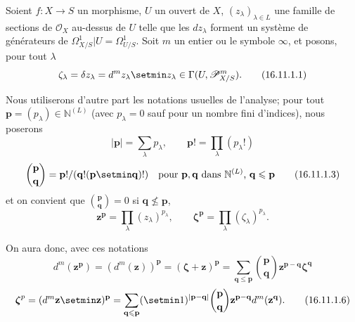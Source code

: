 \begin{env}[16.11.1]
\label{IV.16.11.1}
Soient $f:X\to S$ un morphisme, $U$ un ouvert de $X$,
$(z_\lambda)_{\lambda\in L}$ une famille de sections de $\mathcal{O}_X$
au-dessus de $U$ telle que les $dz_\lambda$ forment un système de générateurs
de $\varOmega_{X/S}^1|U=\varOmega_{U/S}^1$. Soit $m$ un entier ou le symbole
$\infty$, et posons, pour tout $\lambda$
\[
  \zeta_\lambda=\delta z_\lambda=d^m z_\lambda\setmin z_\lambda
  \in\Gamma(U,\mathscr{P}_{X/S}^m).
  \tag{16.11.1.1}
  \label{IV.16.11.1.1}
\]

Nous utiliserons d'autre part les notations usuelles de l'analyse; pour tout
$\mathbf{p}=(p_\lambda)\in\mathbb{N}^{(L)}$ (avec $p_\lambda=0$ sauf pour un
nombre fini d'indices), nous poserons
\[
  |\mathbf{p}|=\sum_\lambda p_\lambda,
  \qquad \mathbf{p}!=\prod_\lambda(p_\lambda!)
  \tag{16.11.1.2}
  \label{IV.16.11.1.2}
\]
\[
  \binom{\mathbf{p}}{\mathbf{q}}
  =\mathbf{p}!/(\mathbf{q}!(\mathbf{p}\setmin\mathbf{q})!)
  \quad\text{pour $\mathbf{p},\mathbf{q}$ dans $\mathbb{N}^{(L)}$,
  $\mathbf{q}\leq\mathbf{p}$}
  \tag{16.11.1.3}
  \label{IV.16.11.1.3}
\]
et on convient que $\binom{\mathbf{p}}{\mathbf{q}}=0$ si
$\mathbf{q}\nleq\mathbf{p}$,
\[
  \mathbf{z}^{\mathbf{p}}=\prod_\lambda(z_\lambda)^{p_\lambda},
  \qquad
  \boldsymbol{\zeta}^{\mathbf{p}}=\prod_\lambda(\zeta_\lambda)^{p_\lambda}.
  \tag{16.11.1.4}
  \label{IV.16.11.1.4}
\]

On aura donc, avec ces notations
\[
  d^m(\mathbf{z}^{\mathbf{p}})
  =(d^m(\mathbf{z}))^{\mathbf{p}}
  =(\boldsymbol{\zeta}+\mathbf{z})^{\mathbf{p}}
  =\sum_{\mathbf{q}\leq\mathbf{p}}
    \binom{\mathbf{p}}{\mathbf{q}}
    \mathbf{z}^{\mathbf{p}-\mathbf{q}}\boldsymbol{\zeta}^{\mathbf{q}}
  \tag{16.11.1.5}
  \label{IV.16.11.1.5}
\]
\[
  \boldsymbol{\zeta}^{p}
  =(d^m\mathbf{z}\setmin\mathbf{z})^{\mathbf{p}}
  =\sum_{\mathbf{q}\leq\mathbf{p}}
    (\setmin 1)^{|\mathbf{p}-\mathbf{q}|}
    \binom{\mathbf{p}}{\mathbf{q}}
    \mathbf{z}^{\mathbf{p}-\mathbf{q}}d^m(\mathbf{z}^{\mathbf{q}}).
  \tag{16.11.1.6}
  \label{IV.16.11.1.6}
\]


\end{env}
